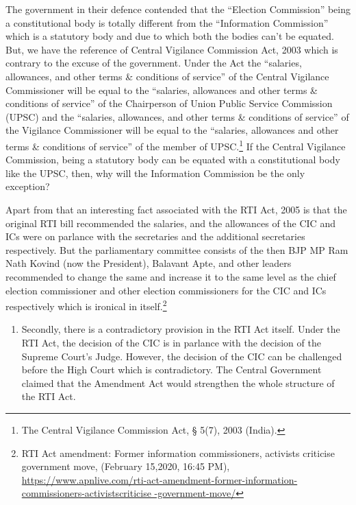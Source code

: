 \begin{multicols}{2}
\begin{enumerate}
\noi
The government in their defence contended that the “Election Commission” being a
constitutional body is totally different from the “Information Commission” which is a
statutory body and due to which both the bodies can’t be equated. But, we have the
reference of Central Vigilance Commission Act, 2003 which is contrary to the excuse
of the government. Under the Act the “salaries, allowances, and other terms
\& conditions of service” of the Central Vigilance Commissioner will be equal to the
“salaries, allowances and other terms \& conditions of service” of the Chairperson of
Union Public Service Commission (UPSC) and the “salaries, allowances, and other
terms \& conditions of service” of the Vigilance Commissioner will be equal to the
“salaries, allowances and other terms \& conditions of service” of the member of
UPSC.\footnote{The Central Vigilance Commission Act, § 5(7), 2003 (India).} 
If the Central Vigilance Commission, being a statutory body can be equated
with a constitutional body like the UPSC, then, why will the Information Commission
be the only exception?
\end{enumerate}

\noi
Apart from that an interesting fact associated with the RTI Act, 2005 is that the original RTI
bill recommended the salaries, and the allowances of the CIC and ICs were on parlance with 
the secretaries and the additional secretaries respectively. But the parliamentary committee
consists of the then BJP MP Ram Nath Kovind (now the President), Balavant Apte, and other
leaders recommended to change the same and increase it to the same level as the chief
election commissioner and other election commissioners for the CIC and ICs respectively
which is ironical in itself.\footnote{RTI Act amendment: Former information commissioners, activists criticise government move, (February 15,2020, 16:45 PM), \url{https://www.apnlive.com/rti-act-amendment-former-information-commissioners-activistscriticise
-government-move/}}


\begin{enumerate}
\addtocounter{enumi}{1}
\item Secondly, there is a contradictory provision in the RTI Act itself. Under the RTI Act,
the decision of the CIC is in parlance with the decision of the Supreme Court’s Judge.
However, the decision of the CIC can be challenged before the High Court which is
contradictory. The Central Government claimed that the Amendment Act would
strengthen the whole structure of the RTI Act.


\end{enumerate}
\end{multicols}
